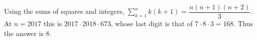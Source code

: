 Using the sums of squares and integers, $\sum_{k=1}^n k(k+1)=\dfrac{n(n+1)(n+2)}{3}$. At $n=2017$ this is $2017\cdot2018\cdot673$, whose last digit is that of $7\cdot8\cdot3=168$. Thus the answer is $\boxed8$.
